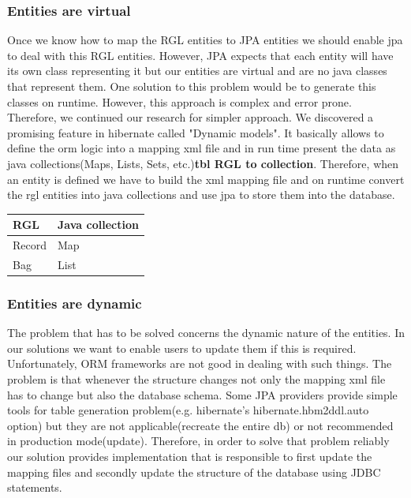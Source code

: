 \documentclass[a4paper, notitlepage]{article}
\begin{document}
\subsubsection{Entities are virtual}
Once we know how to map the RGL entities to JPA entities we should enable jpa to deal with this RGL entities. However, JPA expects that each entity will have its own class representing it but our entities are virtual and are no java classes that represent them. One solution to this problem would be to generate this classes on runtime. However, this approach is complex and error prone. Therefore, we continued our research for simpler approach. We discovered a promising feature in hibernate called "Dynamic models". It basically allows to define the orm logic into a mapping xml file and in run time present the data as java collections(Maps, Lists, Sets, etc.)\textbf{tbl RGL to collection}. Therefore, when an entity is defined we have to build the xml mapping file and on runtime convert the rgl entities into java collections and use jpa to store them into the database.

\begin{center}
    \begin{tabular}{ | l | l |}
    \hline
    RGL & Java collection  \\ \hline
    Record & Map  \\ \hline
    Bag & List  \\ \hline

    \end{tabular}
\end{center}
 
\subsubsection{Entities are dynamic}
The problem that has to be solved concerns the dynamic nature of the entities. In our solutions we want to enable users to update them if this is required. Unfortunately, ORM frameworks are not good in dealing with such things. The problem is that whenever the structure changes not only the mapping xml file has to change but also the database schema. Some JPA providers provide simple tools for table generation problem(e.g. hibernate's hibernate.hbm2ddl.auto option) but they are not applicable(recreate the entire db) or not recommended in production mode(update). Therefore, in order to solve that problem reliably our solution provides implementation that is responsible to first update the mapping files and secondly update the structure of the database using JDBC statements.
\end{document}
